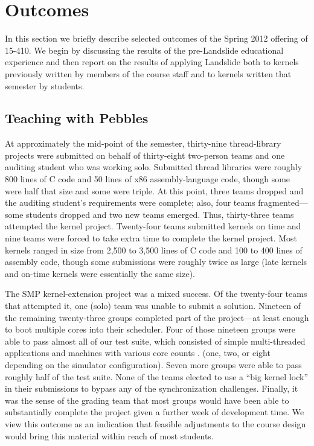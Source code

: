 \section{Outcomes}

In this section we briefly describe selected
outcomes of the Spring 2012 offering of 15-410.
We begin by discussing the results of the
pre-Landslide educational experience and then
report on the results of applying Landslide both to
kernels previously written by members of the course staff
and to kernels written that semester by students.

\subsection{Teaching with Pebbles}

At approximately the mid-point of the semester,
thirty-nine thread-library projects were submitted
on behalf of thirty-eight two-person teams and one
auditing student who was working solo.
%
Submitted thread libraries were roughly 800 lines of C code
and 50 lines of x86 assembly-language code,
though some were half that size and some were triple.
%
At this point, three teams dropped and the auditing
student's requirements were complete;
also, four teams fragmented---some students dropped and
two new teams emerged.
Thus, thirty-three teams attempted the kernel project.
%
Twenty-four teams submitted kernels on time and nine
teams were forced to take extra time to complete the
kernel project.
Most kernels ranged in size from 2,500 to 3,500 lines
of C code and 100 to 400 lines of assembly code,
though some submissions were roughly twice as large
(late kernels and on-time kernels were essentially the
same size).


The SMP kernel-extension project
was a mixed success.
Of the twenty-four teams that attempted it,
one (solo) team was unable to submit a solution.
Nineteen of the remaining twenty-three groups
completed part of the project---at least enough to
boot multiple cores
into their scheduler.
Four of those nineteen groups were able to pass
almost all of our test suite,
which consisted of simple multi-threaded applications
and machines with various core counts\shortversion
{.}
{(one, two, or eight depending on the simulator configuration).}
Seven more groups were able to pass roughly half of the test suite.
None of the teams elected to use a ``big kernel lock'' in their submissions to bypass any of the synchronization challenges.
Finally, it was the sense of the grading team that
most groups would have been able to substantially complete
the project given a further week of development time.
We view this outcome as an indication that feasible adjustments
to the course design would bring this material within reach
of most students.


